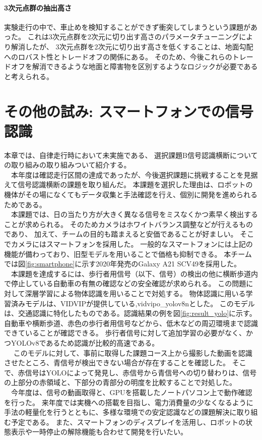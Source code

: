 \documentclass[twocolumn,9pt]{jsproceedings}
\begin{document}
\paragraph{3次元点群の抽出高さ}
実験走行の中で、車止めを検知することができず衝突してしまうという課題があった。
これは3次元点群を2次元に切り出す高さのパラメータチューニングにより解消したが、
3次元点群を2次元に切り出す高さを低くすることは、地面勾配へのロバスト性とトレードオフの関係にある。
そのため、今後これらのトレードオフを解消できるような地面と障害物を区別するようなロジックが必要であると考えられる。

\section{その他の試み: スマートフォンでの信号認識}
本章では、自律走行時において未実施である、
選択課題B信号認識横断についての取り組みの取り組みついて紹介する。
\\　本年度は確認走行区間の達成であったが、今後選択課題に挑戦することを見据えて信号認識横断の課題を取り組んだ。
本課題を選択した理由は、ロボットの機体がその場になくてもデータ収集と手法確認を行え、個別に開発を進められるためである。
\\　本課題では、日の当たり方が大きく異なる信号をミスなくかつ素早く検出することが求められる。
そのためカメラはホワイトバランス調整などが行えるものであり、
加えて、チームの目的も踏まえると安価であることが好ましい。
そこでカメラにはスマートフォンを採用した。
一般的なスマートフォンには上記の機能が備わっており、旧型モデルを用いることで価格も抑制できる。
本チームでは図\ref{fig:smartphone}に示す2020年発売のGalaxy A21 SCV49を採用した。
\\　本課題を達成するには、歩行者用信号（以下、信号）の検出の他に横断歩道内で停止している自動車の有無の確認などの安全確認が求められる。
この問題に対して深層学習による物体認識を用いることで対処する。
物体認識に用いる学習済みモデルは、VIDVIP\cite{BabaVIDVIP}が提供している,vidvipo\_yolov8nとした。
このモデルは、交通認識に特化したものである。認識結果の例を図\ref{fig:result_yolo}に示す。
自動車や横断歩道、赤色の歩行者用信号などから、低木などの周辺環境まで認識できていることが確認できる。
歩行者信号に対して追加学習の必要がなく、かつYOLOv8であるため認識が比較的高速である。
\\　
このモデルに対して、事前に取得した課題コース上から撮影した動画を認識させたところ、青信号が検出できない場合が存在することを確認した。
そこで、赤信号はYOLOによって発見し、赤信号から青信号への切り替わりは、信号の上部分の赤領域と、下部分の青部分の明度を比較することで対処した。
\\　今年度は、信号の動画取得と、GPUを搭載したノートパソコン上で動作確認を行った。
来年度では実機への搭載を目指し、電力消費量の少なくなるように手法の軽量化を行うとともに、多様な環境での安定認識などの課題解決に取り組む予定である。
また、スマートフォンのディスプレイを活用し、ロボットの状態表示や一時停止の解除機能も合わせて開発を行いたい。
\end{document}
